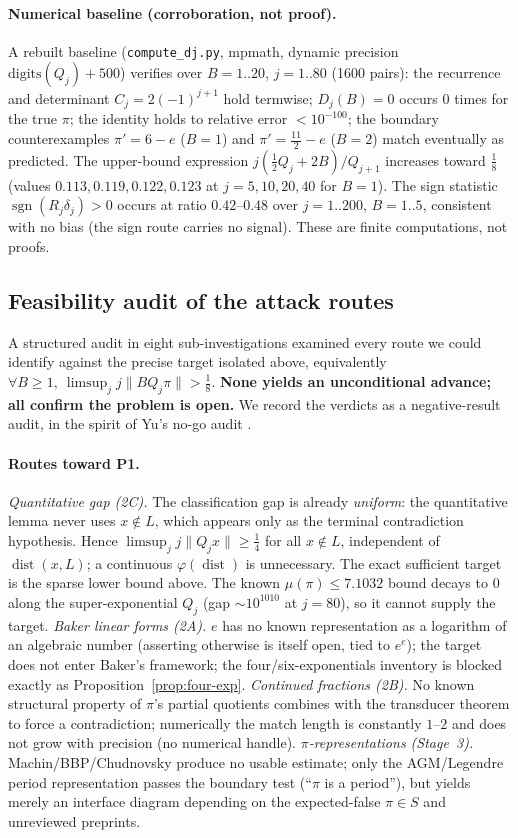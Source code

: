 \documentclass[11pt]{amsart}
\theoremstyle{definition}
\theoremstyle{remark}
\numberwithin{equation}{section}
\begin{document}
\paragraph{Numerical baseline (corroboration, not proof).} A rebuilt baseline (\texttt{compute\_dj.py}, mpmath, dynamic precision $\mathrm{digits}(Q_j)+500$) verifies over $B=1..20$, $j=1..80$ (1600 pairs): the recurrence and determinant $C_j=2(-1)^{j+1}$ hold termwise; $D_j(B)=0$ occurs $0$ times for the true $\pi$; the identity holds to relative error $<10^{-100}$; the boundary counterexamples $\pi'=6-e$ ($B=1$) and $\pi'=\tfrac{11}{2}-e$ ($B=2$) match eventually as predicted. The upper-bound expression $j(\tfrac12Q_j+2B)/Q_{j+1}$ increases toward $\tfrac18$ (values $0.113,0.119,0.122,0.123$ at $j=5,10,20,40$ for $B=1$). The sign statistic $\operatorname{sgn}(R_j\delta_j)>0$ occurs at ratio $0.42$--$0.48$ over $j=1..200$, $B=1..5$, consistent with no bias (the sign route carries no signal). These are finite computations, not proofs.

\subsection{Feasibility audit of the attack routes}\label{sec:feasibility}

A structured audit in eight sub-investigations examined every route we could identify against the precise target isolated above, equivalently $\forall B\ge1,\ \limsup_j j\|BQ_j\pi\|>\tfrac18$. \textbf{None yields an unconditional advance; all confirm the problem is open.} We record the verdicts as a negative-result audit, in the spirit of Yu's no-go audit \cite{Yu2026}.

\paragraph{Routes toward P1.}
\emph{Quantitative gap (2C).} The classification gap is already \emph{uniform}: the quantitative lemma never uses $x\notin L$, which appears only as the terminal contradiction hypothesis. Hence $\limsup_j j\|Q_jx\|\ge\tfrac14$ for all $x\notin L$, independent of $\operatorname{dist}(x,L)$; a continuous $\varphi(\operatorname{dist})$ is unnecessary. The exact sufficient target is the sparse lower bound above. The known $\mu(\pi)\le7.1032$ bound decays to $0$ along the super-exponential $Q_j$ (gap $\sim10^{1010}$ at $j=80$), so it cannot supply the target. \emph{Baker linear forms (2A).} $e$ has no known representation as a logarithm of an algebraic number (asserting otherwise is itself open, tied to $e^e$); the target does not enter Baker's framework; the four/six-exponentials inventory is blocked exactly as Proposition~\ref{prop:four-exp}. \emph{Continued fractions (2B).} No known structural property of $\pi$'s partial quotients combines with the transducer theorem to force a contradiction; numerically the match length is constantly $1$--$2$ and does not grow with precision (no numerical handle). \emph{$\pi$-representations (Stage~3).} Machin/BBP/Chudnovsky produce no usable estimate; only the AGM/Legendre period representation passes the boundary test (``$\pi$ is a period''), but yields merely an interface diagram depending on the expected-false $\pi\in S$ and unreviewed preprints.
\end{document}
